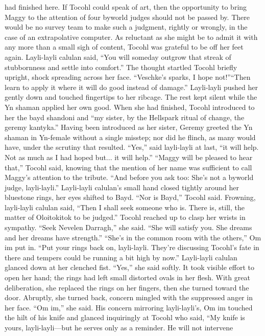 \documentclass[9pt]{article}
\begin{document}
had finished here. If Tocohl could speak of art, then the opportunity to bring Maggy to the attention of
four byworld judges should not be passed by. There would be no survey team to make such a judgment,
rightly or wrongly, in the case of an extrapolative computer.
As reluctant as she might be to admit it with any more than a small sigh of content, Tocohl was
grateful to be off her feet again. Layli-layli calulan said, “You will someday outgrow that streak of
stubbornness and settle into comfort.”
The thought startled Tocohl briefly upright, shock spreading across her face. “Veschke’s sparks, I
hope not!”“Then learn to apply it where it will do good instead of damage.” Layli-layli pushed her gently down
and touched fingertips to her ribcage. The rest kept silent while the Yn shaman applied her own good.
When she had finished, Tocohl introduced to her the bayd shandoni and “my sister, by the
Hellspark ritual of change, the geremy kantyka.”
Having been introduced as her sister, Geremy greeted the Yn shaman in Yn-female without a single
misstep; nor did he flinch, as many would have, under the scrutiny that resulted. “Yes,” said layli-layli at
last, “it will help. Not as much as I had hoped but... it will help.”
“Maggy will be pleased to hear that,” Tocohl said, knowing that the mention of her name was
sufficient to call Maggy’s attention to the tribute. “And before you ask too: She’s not a byworld judge,
layli-layli.”
Layli-layli calulan’s small hand closed tightly around her bluestone rings, her eyes shifted to Bayd.
“Nor is Bayd,” Tocohl said.
Frowning, layli-layli calulan said, “Then I shall seek someone who is. There is, still, the matter of
Oloitokitok to be judged.”
Tocohl reached up to clasp her wrists in sympathy. “Seek Nevelen Darragh,” she said. “She will
satisfy you. She dreams and her dreams have strength.”
“She’s in the common room with the others,” Om im put in. “Put your rings back on, layli-layli.
They’re discussing Tocohl’s fate in there and tempers could be running a bit high by now.”
Layli-layli calulan glanced down at her clenched fist. “Yes,” she said softly. It took visible effort to
open her hand; the rings had left small distorted ovals in her flesh. With great deliberation, she replaced
the rings on her fingers, then she turned toward the door. Abruptly, she turned back, concern mingled
with the suppressed anger in her face. “Om im,” she said.
His concern mirroring layli-layli’s, Om im touched the hilt of his knife and glanced inquiringly at
Tocohl who said, “My knife is yours, layli-layli—but he serves only as a reminder. He will not intervene
\end{document}
